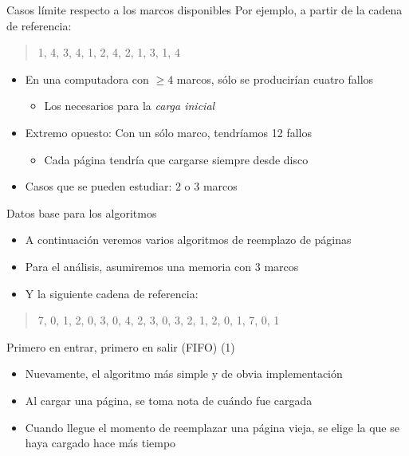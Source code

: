 \documentclass[presentation]{beamer}
\begin{document}
\begin{frame}[label={sec:orge336005}]{Casos límite respecto a los marcos disponibles}
Por ejemplo, a partir de la cadena de referencia:
\begin{quote}
1, 4, 3, 4, 1, 2, 4, 2, 1, 3, 1, 4
\end{quote}
\begin{itemize}
\item En una computadora con \(\ge 4\) marcos, sólo se producirían cuatro fallos
\begin{itemize}
\item Los necesarios para la \emph{carga inicial}
\end{itemize}
\item Extremo opuesto: Con un sólo marco, tendríamos 12 fallos
\begin{itemize}
\item Cada página tendría que cargarse siempre desde disco
\end{itemize}
\item Casos que se pueden estudiar: 2 o 3 marcos
\end{itemize}
\end{frame}

\begin{frame}[label={sec:org0a99475}]{Datos base para los algoritmos}
\begin{itemize}
\item A continuación veremos varios algoritmos de reemplazo de páginas
\item Para el análisis, asumiremos una memoria con 3 marcos
\item Y la siguiente cadena de referencia:
\end{itemize}
\begin{quote}
7, 0, 1, 2, 0, 3, 0, 4, 2, 3, 0, 3, 2, 1, 2, 0, 1, 7, 0, 1
\end{quote}
\end{frame}

\begin{frame}[label={sec:org1ce2e60}]{Primero en entrar, primero en salir (FIFO) (1)}
\begin{itemize}
\item Nuevamente, el algoritmo más simple y de obvia implementación
\item Al cargar una página, se toma nota de cuándo fue cargada
\item Cuando llegue el momento de reemplazar una página vieja, se elige
la que se haya cargado hace más tiempo
\end{itemize}
\end{frame}
\end{document}
